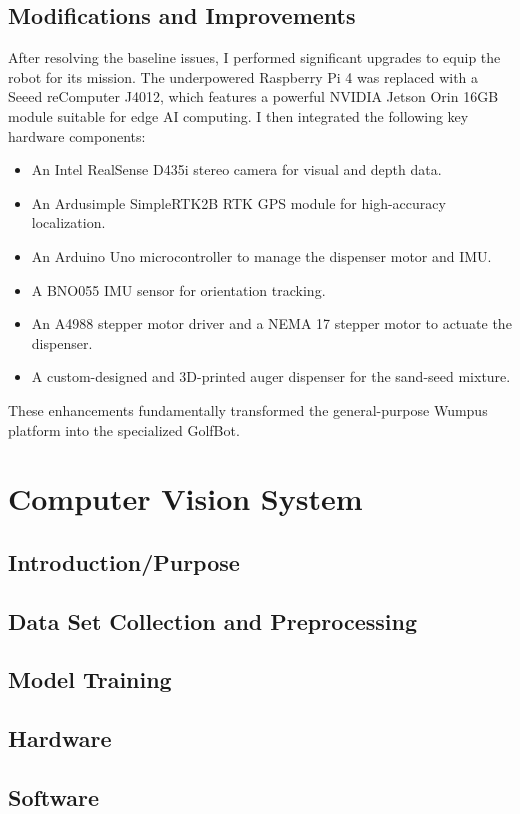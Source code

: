 \subsection{Modifications and Improvements}
\label{ssec:modifications}
After resolving the baseline issues, I performed significant upgrades to equip the robot for its mission. The underpowered Raspberry Pi 4 was replaced with a Seeed reComputer J4012, which features a powerful NVIDIA Jetson Orin 16GB module suitable for edge AI computing. I then integrated the following key hardware components:
\begin{itemize}
    \item An Intel RealSense D435i stereo camera for visual and depth data.
    \item An Ardusimple SimpleRTK2B RTK GPS module for high-accuracy localization.
    \item An Arduino Uno microcontroller to manage the dispenser motor and IMU.
    \item A BNO055 IMU sensor for orientation tracking.
    \item An A4988 stepper motor driver and a NEMA 17 stepper motor to actuate the dispenser.
    \item A custom-designed and 3D-printed auger dispenser for the sand-seed mixture.
\end{itemize}
These enhancements fundamentally transformed the general-purpose Wumpus platform into the specialized GolfBot.

\section{Computer Vision System}
\subsection{Introduction/Purpose}
\subsection{Data Set Collection and Preprocessing}
\subsection{Model Training}
\subsection{Hardware}
\subsection{Software}
